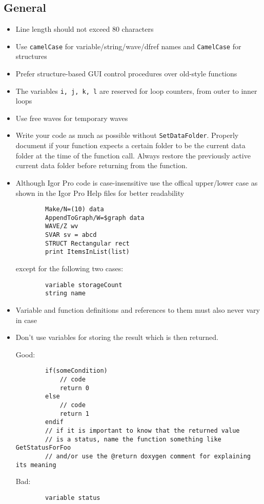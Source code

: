 \documentclass{scrartcl}
\begin{document}
\subsection{General}
%
\begin{itemize}
	\item Line length should not exceed 80 characters
%
	\item Use \texttt{camelCase} for variable/string/wave/dfref names and \texttt{CamelCase} for structures
%
	\item Prefer structure-based GUI control procedures over old-style functions
%
	\item The variables \texttt{i, j, k, l} are reserved for loop counters, from outer to inner loops
%
	\item Use free waves for temporary waves
%
	\item Write your code as much as possible without \texttt{SetDataFolder}. Properly document if your function expects
	      a certain folder to be the current data folder at the time of the function call. Always restore the previously active current data folder
	      before returning from the function.
%
	\item Although Igor Pro code is case-insensitive use the offical upper/lower case as shown in the Igor Pro Help files for better readability
	\begin{verbatim}
		Make/N=(10) data
		AppendToGraph/W=$graph data
		WAVE/Z wv
		SVAR sv = abcd
		STRUCT Rectangular rect
		print ItemsInList(list)
	\end{verbatim}
	except for the following two cases:
	\begin{verbatim}
		variable storageCount
		string name
	\end{verbatim}
%
	\item Variable and function definitions and references to them must also never vary in case
%
	\item Don't use variables for storing the result which is then returned.\par
	Good:
	\begin{verbatim}
		if(someCondition)
			// code
			return 0
		else
			// code
			return 1
		endif
		// if it is important to know that the returned value
		// is a status, name the function something like GetStatusForFoo
		// and/or use the @return doxygen comment for explaining its meaning
	\end{verbatim}
	\begin{minipage}{\textwidth}
	Bad:
	\begin{verbatim}
		variable status


\end{verbatim}
\end{minipage}
\end{itemize}
\end{document}
